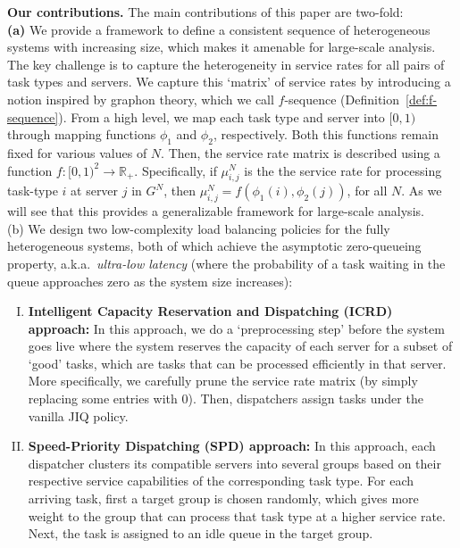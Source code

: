 \documentclass[11pt, reqno]{article}
\numberwithin{equation}{section}
\numberwithin{theorem}{section}
\newcommand{\R}{\mathbb{R}}                 %
\begin{document}
\noindent
\textbf{Our contributions.}
The main contributions of this paper are two-fold:\\

\noindent
\textbf{(a)} We provide a framework to define a consistent sequence of heterogeneous systems with increasing size, which makes it amenable for large-scale analysis. 
The key challenge is to capture the heterogeneity in service rates for all pairs of task types and servers. 
We capture this `matrix' of service rates by introducing a notion inspired by graphon theory, which we call $f$-sequence (Definition~\ref{def:f-sequence}). 
From a high level, we map each task type and server into $[0,1)$ through mapping functions $\phi_1$ and $\phi_2$, respectively. 
Both this functions remain fixed for various values of $N$.
Then, the service rate matrix is described using a function $f:[0,1)^2\rightarrow\R_+$.
Specifically, if $\mu^N_{i,j}$ is the the service rate for processing task-type $i$ at server $j$ in $G^N$, then $\mu^N_{i,j}=f(\phi_1(i),\phi_2(j))$, for all $N$.
As we will see that this provides a generalizable framework for large-scale analysis.\\

\noindent
(b)
We design two low-complexity load balancing policies for the fully heterogeneous systems, both of which achieve the asymptotic zero-queueing property, a.k.a.~\emph{ultra-low latency} (where the probability of a task waiting in the queue approaches zero as the system size increases):
\begin{enumerate}[(I)]
    \item \textbf{Intelligent Capacity Reservation and Dispatching (ICRD) approach:} In this approach, we do a `preprocessing step' before the system goes live where the system reserves the capacity of each server for a subset of `good' tasks, which are tasks that can be processed efficiently in that server. 
    More specifically, we carefully prune the service rate matrix (by simply replacing some entries with 0).
    Then, dispatchers assign tasks under the vanilla JIQ policy. 
    \item \textbf{Speed-Priority Dispatching (SPD) approach:} In this approach, each dispatcher clusters its compatible servers into several groups based on their respective service capabilities of the corresponding task type. 
    For each arriving task, first a target group is chosen randomly, which gives more weight to the group that can process that task type at a higher service rate. 
    Next, the task is assigned to an idle queue in the target group. 
\end{enumerate}
\end{document}
